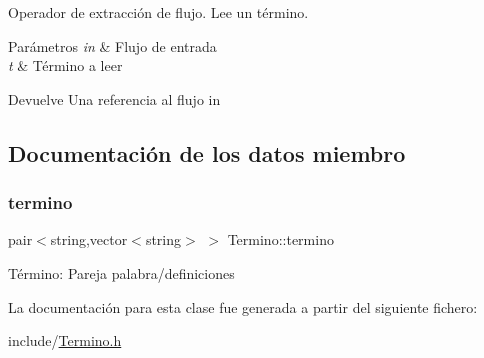 Operador de extracción de flujo. Lee un término. 


\begin{DoxyParams}{Parámetros}
{\em in} & Flujo de entrada \\
\hline
{\em t} & Término a leer \\
\hline
\end{DoxyParams}
\begin{DoxyReturn}{Devuelve}
Una referencia al flujo in 
\end{DoxyReturn}


\subsection{Documentación de los datos miembro}
\mbox{\label{classTermino_a5656fe283f6e949ec67d6231f7154a3d}} 
\subsubsection{\texorpdfstring{termino}{termino}}
{\footnotesize\ttfamily pair$<$string,vector$<$string$>$ $>$ Termino\+::termino\hspace{0.3cm}{\ttfamily [private]}}

Término\+: Pareja palabra/definiciones 

La documentación para esta clase fue generada a partir del siguiente fichero\+:\begin{DoxyCompactItemize}
\item 
include/\hyperlink{Termino_8h}{Termino.\+h}\end{DoxyCompactItemize}
